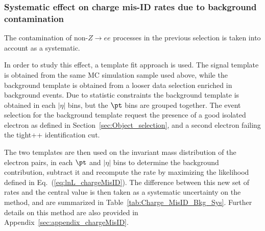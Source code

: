  \subsubsection{Systematic effect on charge mis-ID rates due to background contamination}

The contamination of non-$Z\rightarrow{}ee$ processes in the previous selection is taken into account as a systematic.

In order to study this effect, a template fit approach is used. The signal template is obtained from the same MC simulation sample used above, while the background template is obtained from a looser data selection enriched in background events. Due to statistic constraints the background template is obtained in each $|\eta|$ bins, but the $\pt$ bins are grouped together. The event selection for the background template request the presence of a good isolated electron as defined in Section~\ref{sec:Object_selection}, and a second electron failing the tight++ identification cut. 

The two templates are then used on the invariant mass distribution of the electron pairs, in each $\pt$ and $|\eta|$ bins to determine the background contribution, subtract it and recompute the rate by maximizing the likelihood defined in Eq.~(\ref{eq:lnL_chargeMisID}). The difference between this new set of rates and the central value is then taken as a systematic uncertainty on the method, and are summarized in Table~\ref{tab:Charge_MisID_Bkg_Sys}. Further details on this method are also provided in Appendix~\ref{sec:appendix_chargeMisID}.







